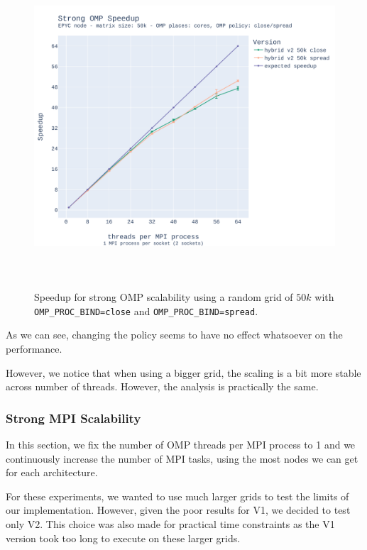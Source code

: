 \documentclass{report}
\begin{document}
\begin{figure}[H]
\centering
\includegraphics[width=14cm, height=12cm]{./images/strong_OMP_epyc_hybrid_grid_050k_speedup.pdf}
\caption{\label{fig:strongomp10kspeedupepyc}Speedup for strong OMP scalability using a random 
grid of $50k$ with \texttt{OMP\_PROC\_BIND=close} and \texttt{OMP\_PROC\_BIND=spread}. }
\end{figure}
As we can see, changing the policy seems to have no effect whatsoever on the 
performance. 

However, we notice that when using a bigger grid, the scaling is a bit more stable 
across number of threads. However, the analysis is practically the same.

\subsubsection{Strong MPI Scalability}

In this section, we fix the number of OMP threads per MPI process to 1 and we 
continuously increase the number of MPI tasks, using the most nodes we can get 
for each architecture. 

For these experiments, we wanted to use much larger grids to test the limits 
of our implementation. However, given the poor results for V1, we 
decided to test only V2. This choice was also made for practical time 
constraints as the V1 version took too long to execute on these larger grids. 
\end{document}
